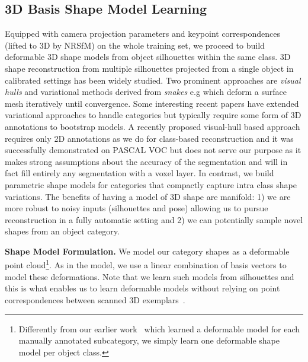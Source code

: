 \subsection{3D Basis Shape Model Learning}
Equipped with camera projection parameters and keypoint correspondences (lifted to 3D by NRSfM) on the whole training set, we proceed to build deformable 3D shape models from object silhouettes within the same class. 3D shape reconstruction from multiple silhouettes projected from a single object in calibrated settings has been widely studied. Two prominent approaches are \textit{visual hulls} \cite{laurentini1994hull} and variational methods derived from \textit{snakes} e.g \cite{esteban2004snake,yusuf2006snake} which deform a surface mesh iteratively until convergence. Some interesting recent papers have extended variational approaches to handle categories \cite{cashman2013dolphins,chen20123d} but typically require some form of 3D annotations to bootstrap models. A recently proposed visual-hull based approach \cite{carvi14} requires only 2D annotations as we do for class-based reconstruction and it was successfully demonstrated on PASCAL VOC but does not serve our purpose as it makes strong assumptions about the accuracy of the segmentation and will in fact fill entirely any segmentation with a voxel layer. In contrast, we build parametric shape models for categories that compactly capture intra class shape variations. The benefits of having a model of 3D shape are manifold: 1) we are more robust to noisy inputs (silhouettes and pose) allowing us to pursue reconstruction in a fully automatic setting and 2) we can potentially sample novel shapes from an object category.



\vspace{3mm}
\noindent \textbf{Shape Model Formulation.} We model our category shapes as a deformable point cloud\footnote{Differently from our earlier work~\cite{categoryShapesKar15} which learned a deformable model for each manually annotated subcategory, we simply learn one deformable shape model per object class.}. As in the \nrsfm model, we use a linear combination of basis vectors to model these deformations. Note that we learn such models from silhouettes and this is what enables us to learn deformable models without relying on point correspondences between scanned 3D exemplars~\cite{blanz2003face}.

